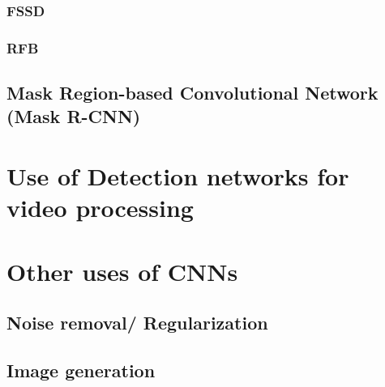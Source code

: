 \subsubsection{FSSD}
\subsubsection{RFB}

\subsection{Mask Region-based Convolutional Network (Mask R-CNN)}

\section{Use of Detection networks for video processing}

\section{Other uses of CNNs}
\subsection{Noise removal/ Regularization}
\subsection{Image generation}



